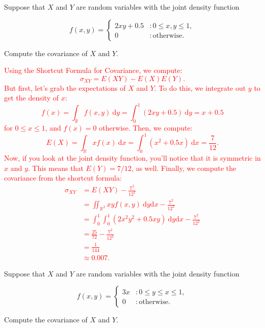 \documentclass[12pt,reqno]{amsart}
\begin{document}
\bigskip

\prob Suppose that $X$ and $Y$ are random variables with the joint density function

	\[
	f(x,y) = \begin{cases}
	2xy + 0.5 & : 0 \leq x, y \leq 1, \\
	0 & : \text{otherwise}.
	\end{cases}
	\]
	
Compute the covariance of $X$ and $Y$.

\bigskip
\textcolor{red}{Using the Shortcut Formula for Covariance, we compute:
	\[
	\sigma_{XY} = E(XY) - E(X) E(Y).
	\]
But first, let's grab the expectations of $X$ and $Y$. To do this, we integrate out $y$ to get the density of $x$:
	\[f(x) = \int_{\mathbb{R}} f(x,y) \ \text{d} y = \int_0^1 \left( 2xy+0.5\right) \ \text{d}y = x + 0.5
	\]
for $0\leq x\leq 1$, and $f(x)=0$ otherwise. Then, we compute:
	\[E(X) = \int_{\mathbb{R}} x f(x) \ \text{d}x = \int_0^1 (x^2+0.5x) \ \text{d} x = \frac{7}{12}.
	\]
Now, if you look at the joint density function, you'll notice that it is symmetric in $x$ and $y$. This means that $E(Y) = 7/12$, as well. Finally, we compute the covariance from the shortcut formula:
	\begin{align*}
	\sigma_{XY} &= E(XY) - \frac{7^2}{12^2} \\
	&= \iint_{\mathbb{R}^2} xy f(x,y) \ \text{d}y \text{d}x - \frac{7^2}{12^2} \\
	&= \int_0^1 \int_0^1 (2x^2y^2 + 0.5xy) \ \text{d}y \text{d}x - \frac{7^2}{12^2} \\
	&= \frac{25}{72} - \frac{7^2}{12^2} \\
	&= \frac{1}{144} \\
	&\approx 0.007.
	\end{align*}}













\bigskip
\prob Suppose that $X$ and $Y$ are random variables with the joint density function

	\[
	f(x,y) = \begin{cases}
	3x & : 0 \leq y\leq x \leq 1, \\
	0 & : \text{otherwise}.
	\end{cases}
	\]
	
Compute the covariance of $X$ and $Y$.
\end{document}
